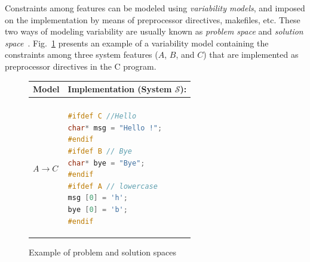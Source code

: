 \begin{tikzborder}{\cite{Gargantini16:validation}}
\begin{tikzborder}{\cite{gargantini_combinatorial_2017}}
\begin{tikzborder}{\cite{gargantini_combinatorial_2017}}
\begin{tikzborder}{\cite{garn2019}}
\begin{tikzborder}{\cite{arcaini2019achieving}}
	Constraints among features can be modeled using {\it variability models}, and imposed on the implementation by means of preprocessor directives, makefiles, etc. These two ways of modeling variability are usually known as {\it problem space} and {\it solution space}~\cite{NadiBKC14}. Fig.~\ref{fig:problSolSpaces} presents an example of a variability model containing the constraints among three system features ($A$, $B$, and $C$) that are implemented as preprocessor directives in the C program.
	\begin{figure}[!tb]
		\begin{center}
			\begin{tabular}[t]{p{25mm}p{45mm}}
				Model \m & Implementation (System $\mathcal{S}$):\\\hline 
				\begin{minipage}{25mm}
$A \rightarrow B$ \\
$A \rightarrow C$
				\end{minipage}
				&\begin{minipage}{45mm}
					\lstset{basicstyle=\linespread{0.8}\ttfamily\footnotesize,breaklines = true,columns=flexible}
					\begin{lstlisting}[language=C]
#ifdef C //Hello
char* msg = "Hello !";
#endif 
#ifdef B // Bye 
char* bye = "Bye";
#endif 
#ifdef A // lowercase 
msg [0] = 'h';
bye [0] = 'b'; 
#endif
					\end{lstlisting}
				\end{minipage}
				\\
				\hline
			\end{tabular}
		\end{center}
		\caption{Example of problem and solution spaces}
		\label{fig:problSolSpaces}
	\end{figure}
	

\end{tikzborder}
\end{tikzborder}
\end{tikzborder}
\end{tikzborder}
\end{tikzborder}
